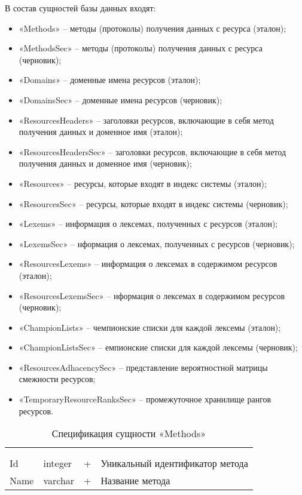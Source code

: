В состав сущностей базы данных входят:
\begin{itemize}
\item «Methods» -- методы (протоколы) получения данных с ресурса (эталон);
\item «MethodsSec» -- методы (протоколы) получения данных с ресурса (черновик);
\item «Domains» -- доменные имена ресурсов (эталон);
\item «DomainsSec» -- доменные имена ресурсов (черновик);
\item «ResourcesHeaders» -- заголовки ресурсов, включающие в себя метод получения данных и доменное имя (эталон);
\item «ResourcesHeadersSec» -- заголовки ресурсов, включающие в себя метод получения данных и доменное имя (черновик);
\item «Resources» -- ресурсы, которые входят в индекс системы (эталон);
\item «ResourcesSec» -- ресурсы, которые входят в индекс системы (черновик);
\item «Lexems» -- информация о лексемах, полученных с ресурсов (эталон);
\item «LexemsSec» -- нформация о лексемах, полученных с ресурсов (черновик);
\item «ResourcesLexems» -- информация о лексемах в содержимом ресурсов (эталон);
\item «ResourcesLexemsSec» -- нформация о лексемах в содержимом ресурсов (черновик);
\item «ChampionLists» -- чемпионские списки для каждой лексемы (эталон);
\item «ChampionListsSec» -- емпионские списки для каждой лексемы (черновик);
\item «ResourcesAdhacencySec» -- представление вероятностной матрицы смежности ресурсов;
\item «TemporaryResourceRanksSec» -- промежуточное хранилище рангов ресурсов.
\end{itemize}

\begin{xltabular}{\textwidth}{|X|X|X|X|}
	\caption{Спецификация сущности «Methods»}\label{indexer_methods:table}\\ \hline
	 &  &  &  \\ \hline
	 &  &  &  \\ \hline
	\endfirsthead
	 \hline
	 &  &  &  \\ \hline
	\endhead
	Id & integer & + & Уникальный идентификатор метода \\ \hline
	Name & varchar & + & Название метода \\ \hline
\end{xltabular}

